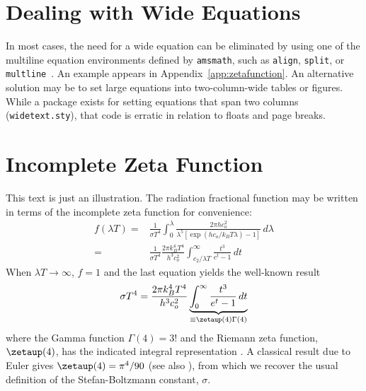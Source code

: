 \documentclass[largesc,upint,varvw,barcolor=Red4,nocopyright,hyphenate,balance,lang-second=french,lang=english]{asmejour}
\begin{document}
\appendix   %

\section{Dealing with Wide Equations}

In most cases, the need for a wide equation can be eliminated by using one of the multiline equation environments defined by \texttt{amsmath}, such as \texttt{align}, \texttt{split}, or \texttt{multline}~\cite{amsmath}. An example appears in Appendix~\ref{app:zetafunction}. An alternative solution may be to set large equations into two-column-wide tables or figures. While a package exists for setting equations that span two columns (\texttt{widetext.sty}), that code is erratic in relation to floats and page breaks.

\section{Incomplete Zeta Function~\cite{Lienhard2019c}\label{app:zetafunction}}

This text is just an illustration. The radiation fractional function may be written in terms of the incomplete zeta function for convenience:
\begin{align}
f(\lambda T)  = {}&  \frac{1}{\sigma T^4} \int_0^\lambda\frac{2\pi h c_o^2}{\lambda^5 \left[ \exp (h c_o/k_B T \lambda) - 1\right] } \, d\lambda \\
 = {}&  \frac{1}{\sigma T^4}\frac{2\pi k_B^4 T^4}{h^3c_o^2}\int^\infty_{c_2/\lambda T}\frac{t^3}{e^t -1}\, dt\label{eqn:zeta}
\end{align}
When $\lambda T \rightarrow \infty$, $f = 1$ and the last equation yields the well-known result
\begin{equation}
 {\sigma T^4} =\frac{2\pi k_B^4 T^4}{h^3c_o^2} \underbrace{\int_0^\infty \frac{t^3}{e^t - 1} \, dt}_{\equiv \zetaup(4)\Gamma(4)} 
\end{equation}
where the Gamma function $\Gamma(4) = 3!$ and the Riemann zeta function, $\zetaup(4)$, has the indicated integral representation \cite[\S13.12]{ww1927}.  A classical result due to Euler \cite{euler1740} gives $\zetaup(4) = \pi^4/90$ (see also \cite[\S167]{euler1748}), from which we recover the usual definition of the  Stefan-Boltzmann constant, $\sigma$. 
\end{document}

